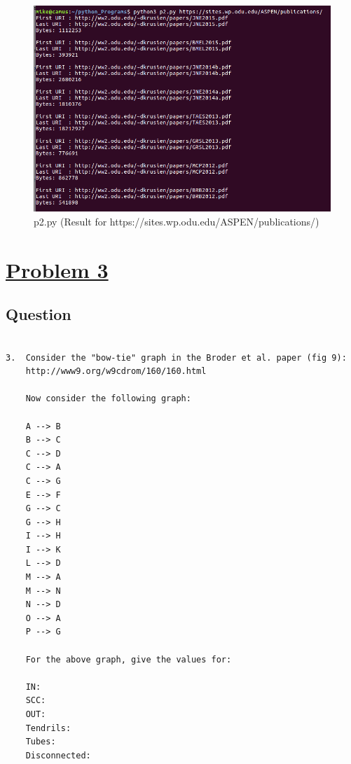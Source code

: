 \documentclass{article}
\begin{document}
\begin{figure}[ht!]
\centering
\includegraphics[width=\linewidth]{p2_result2.png}
\caption{p2.py (Result for https://sites.wp.odu.edu/ASPEN/publications/) \label{overflow}}
\end{figure}




\section*{\underline{Problem 3}}

\subsection*{Question}

\begin{verbatim}

3.  Consider the "bow-tie" graph in the Broder et al. paper (fig 9):
    http://www9.org/w9cdrom/160/160.html

    Now consider the following graph:

    A --> B
    B --> C
    C --> D
    C --> A
    C --> G
    E --> F
    G --> C
    G --> H
    I --> H
    I --> K
    L --> D
    M --> A
    M --> N
    N --> D
    O --> A
    P --> G 
    
    For the above graph, give the values for:

    IN: 
    SCC: 
    OUT: 
    Tendrils: 
    Tubes: 
    Disconnected:

\end{verbatim}
\end{document}
